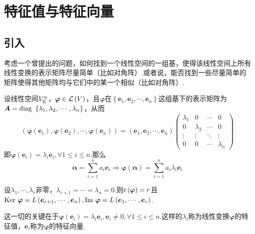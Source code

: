 \section{特征值与特征向量}
\subsection{引入}
考虑一个曾提出的问题，如何找到一个线性空间的一组基，使得该线性空间上所有线性变换的表示矩阵尽量简单（比如对角阵）.或者说，能否找到一些尽量简单的矩阵使得其他矩阵均与它们中的某一个相似（比如对角阵）.

设线性空间$V_{\mathbb{K}}^n$，$\bm{\varphi}\in\mathcal{L}  \left(V\right)$，且$\bm{\varphi}$在$\left\{
    \bm{e}_1,\bm{e}_2,\cdots,\bm{e}_n
    \right\}$这组基下的表示矩阵为$\bm{A}=\operatorname{diag\,} \,\left\{
    \lambda_1,\lambda_2,\cdots,\lambda_n
    \right\}$，从而
\[
    \left(
    \bm{\varphi}\left(\bm{e}_1\right),\bm{\varphi}\left(\bm{e}_2\right),\cdots,\bm{\varphi}\left(\bm{e}_n\right)
    \right)=
    \left(
    \bm{e}_1,\bm{e}_2,\cdots,\bm{e}_n
    \right)\begin{pmatrix}
        \lambda_1 & 0         & \cdots & 0         \\
        0         & \lambda_2 & \cdots & 0         \\
        \vdots    & \vdots    & \ddots & \vdots    \\
        0         & 0         & \cdots & \lambda_n
    \end{pmatrix}
\]即$\bm{\varphi}\left(
    \bm{e}_i
    \right)=\lambda_i\bm{e}_i,\forall 1\leqslant i\leqslant n.$那么
\[
    \bm{\alpha}= \sum_{i=1}^{n} a_i\bm{e}_i\Longrightarrow
    \bm{\varphi}\left(
    \bm{\alpha}
    \right)=\sum_{i=1}^{n}a_i\lambda_i
    \bm{e}_i
\]

设$\lambda_1,\cdots,\lambda_r$非零，$
    \lambda_{r+1}=\cdots=\lambda_n=0.$则$\mathrm{r} \left(
    \bm{\varphi}
    \right)=r$且$\operatorname{Ker\,} \bm{\varphi}=L\left(
    \bm{e}_{r+1},\cdots,\bm{e}_n
    \right),\operatorname{Im\,} \bm{\varphi}=L\left(
    \bm{e}_1,\cdots,\bm{e}_r
    \right)$.

这一切的关键在于$
    \bm{\varphi}\left(
    \bm{e}_i
    \right)=\lambda_i\bm{e}_i,\bm{e}_i\neq 0,\forall 1\leqslant i\leqslant n
$.这样的$\lambda_i$称为线性变换$\bm{\varphi}$的特征值，$\bm{e}_i$称为$\bm{\varphi}$的特征向量.
